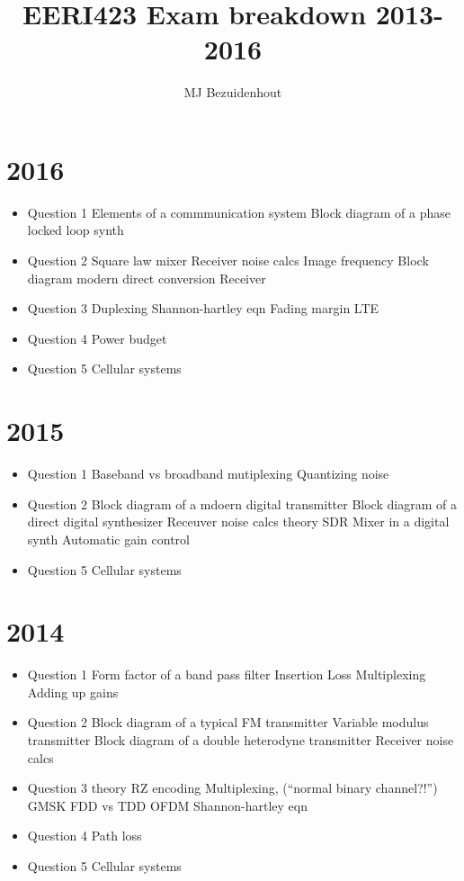 \documentclass{article}
\author{MJ Bezuidenhout}
\title{EERI423 Exam breakdown 2013-2016}
\begin{document}
\begin{multicols}{2}
\maketitle
\section{2016}
\begin{itemize}
	\item Question 1
		\subitem Elements of a commmunication system 
		\subitem Block diagram of a phase locked loop synth
	\item Question 2
		\subitem Square law mixer
		\subitem Receiver noise calcs
		\subitem Image frequency
		\subitem Block diagram modern direct conversion Receiver
	\item Question 3
		\subitem Duplexing
		\subitem Shannon-hartley eqn
		\subitem Fading margin
		\subitem LTE
	\item Question 4
		\subitem Power budget
	\item Question 5
		\subitem Cellular systems
	
\end{itemize}
\section{2015}
\begin{itemize}
	\item Question 1
		\subitem Baseband vs broadband
		\subitem mutiplexing
		\subitem Quantizing noise
	\item Question 2
		\subitem Block diagram of a mdoern digital transmitter
		\subitem Block diagram of a direct digital synthesizer
		\subitem Receuver noise calcs
		\subitem theory
			\subsubitem SDR	
			\subsubitem Mixer in a digital synth	
			\subsubitem Automatic gain control	
	\item Question 5
		\subitem Cellular systems
	
\end{itemize}

\section{2014}
\begin{itemize}
	\item Question 1
		\subitem Form factor of a band pass filter
		\subitem Insertion Loss
		\subitem Multiplexing
		\subitem Adding up gains
	\item Question 2
		\subitem Block diagram of a typical FM transmitter
		\subitem Variable modulus transmitter
		\subitem Block diagram of a double heterodyne transmitter
		\subitem Receiver noise calcs
	\item Question 3
		\subitem theory
			\subsubitem RZ encoding
			\subsubitem Multiplexing, (``normal binary channel?!'')
			\subsubitem GMSK
			\subsubitem FDD vs TDD
			\subsubitem OFDM
		\subitem Shannon-hartley eqn
	\item Question 4
		\subitem Path loss
	\item Question 5
		\subitem Cellular systems
	

\end{itemize}
\end{multicols}
\end{document}
